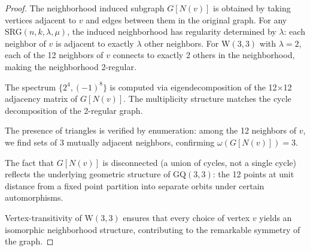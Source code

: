 \documentclass[12pt,a4paper]{article}
\newcommand{\W}{\mathrm{W}(3,3)}
\begin{document}
\begin{proof}
The neighborhood induced subgraph $G[N(v)]$ is obtained by taking vertices adjacent to $v$ and
edges between them in the original graph. For any SRG$(n,k,\lambda,\mu)$, the induced neighborhood
has regularity determined by $\lambda$: each neighbor of $v$ is adjacent to exactly $\lambda$ other
neighbors. For $\W$ with $\lambda = 2$, each of the 12 neighbors of $v$ connects to exactly 2 others
in the neighborhood, making the neighborhood 2-regular.

The spectrum $\{2^4, (-1)^8\}$ is computed via eigendecomposition of the 12$\times$12 adjacency matrix
of $G[N(v)]$. The multiplicity structure matches the cycle decomposition of the 2-regular graph.

The presence of triangles is verified by enumeration: among the 12 neighbors of $v$, we find sets of
3 mutually adjacent neighbors, confirming $\omega(G[N(v)]) = 3$.

The fact that $G[N(v)]$ is disconnected (a union of cycles, not a single cycle) reflects the underlying
geometric structure of GQ$(3,3)$: the 12 points at unit distance from a fixed point partition into
separate orbits under certain automorphisms.

Vertex-transitivity of $\W$ ensures that every choice of vertex $v$ yields an isomorphic neighborhood
structure, contributing to the remarkable symmetry of the graph.
\end{proof}
\end{document}
